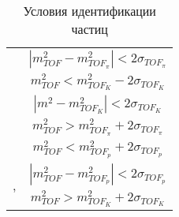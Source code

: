 \begin{comment}
Диапазон поперечных импульсов разбивается на промежутки шириной 0,1 ГэВ/с, на каждом из которых сигналы заряженных адронов аппроксимируются функцией Гаусса. Пример такой аппроксимации в диапазоне поперечных импульсов 1,0-1,1 ГэВ/с представлен на рис. \ref{img:TOF_PID}. 
Далее зависимости от поперечного импульса полученных среднеквадратичных отклонений ($\Tilde{\sigma}_h$) и математических ожиданий ($\Tilde{m}^2_h$) функций Гаусса для адронов h (h=\pipm,\Kpm,\prot, \aprot ) аппроксимировались функцией  \ref{eq:TOFgaus_approx}.

\begin{equation}
	\label{eq:TOFgaus_approx}
	f(p_T) = P_0 +P_1/p_T + P_2/p_T^2 + P_3 \cdot exp(\sqrt{p_T}) +P_4 \cdot \sqrt{p_T} 
\end{equation}
где $P_i, i \in [1,4]$ - параметры аппроксимации.

Значения $\sigma_h$ и $m_h$, вычисленные по формуле \ref{eq:TOFgaus_approx}, использовались для идентификации частиц. Частица, с зарегистрированным квадратом массы $m^2$, идентифицируется как адрон h в том случае, если  $m^2$ удовлетворяет неравенствам $$ m^2_h -2\sigma_h < m^2 < m^2_h +2\sigma_h. $$
При значениях поперечных импульсов \pt~2-3 ГэВ/с происходит наложение сигналов заряженных адронов. В связи с этим было введено дополнительное условие, обеспечивающее непопадание массы частицы в диапазон $\pm 2\sigma_h$ соседних сигналов частиц.
Условия идентификации заряженных адронов приведены в таблице \ref{table:m2cuts}.
\end{comment}

\begin{table}[]
	\caption{Условия идентификации частиц}
	\label{table:m2cuts}
	\begin{center}
		\begin{tabular}{|c|c|}
			\hline
			\multirow{2}{*}{\pipm} & $|m^2_{TOF} - m^2_{TOF_{\pi}}|<2\sigma_{TOF_{\pi}}$ \\ 
			& $m^2_{TOF} < m^2_{TOF_{K}}-2\sigma_{TOF_{K}}$ \\ \hline
			\multirow{3}{*}{\Kpm}  & $|m^2 - m^2_{TOF_{K}}|<2\sigma_{TOF_{K}}$  \\ 
			& $m^2_{TOF} > m^2_{TOF_{\pi}}+2\sigma_{TOF_{\pi}}$\\  
			& $m^2_{TOF} < m^2_{TOF_{p}}+2\sigma_{TOF_{p}}$ \\ \hline
			\multirow{2}{*}{\prot, \aprot} & $|m^2_{TOF} - m^2_{TOF_{p}}|<2\sigma_{TOF_{p}}$ \\ 
			& $m^2_{TOF} > m^2_{TOF_{K}}+2\sigma_{TOF_{K}}$ \\ \hline
		\end{tabular}
	\end{center}
\end{table}



